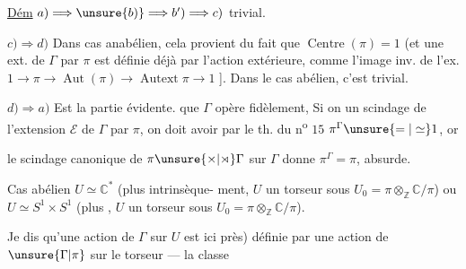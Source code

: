 


\uline{Dém} $a)\Longrightarrow\unsure{b)}\Longrightarrow b')\Longrightarrow c)$ trivial.

$c)\Longrightarrow d)$ Dans cas anabélien, cela provient
du fait que $\operatorname{Centre}(\pi)=1$ (et une ext.
de $\Gamma$ par $\pi$ est définie déjà par l'action
extérieure,  comme l'image inv.
de l'ex. $1\longrightarrow\pi\longrightarrow\operatorname{Aut}(\pi)
\longrightarrow\operatorname{Autext}\pi\longrightarrow1$ ].
Dans le cas abélien, c'est trivial.

$d)\Longrightarrow a)$ Est la partie  évidente. 
  que $\Gamma$
opère fidèlement, 
 
Si on  un scindage de l'extension
$\mathcal E$ de $\Gamma$ par $\pi$, on doit avoir
par le th. du n\textsuperscript{o} $15$ $\pi^\Gamma\unsure{=|\simeq}1$, or

le scindage canonique de $\pi\unsure{\times|\rtimes}\Gamma$ sur $\Gamma$
donne $\pi^\Gamma=\pi$, absurde.

Cas abélien $U\simeq\mathbb C^*$ (plus intrinsèque-
ment, $U$ un torseur sous $U_0=\pi\otimes_{\mathbb Z}\mathbb C/\pi$)
ou $U\simeq S^1\times S^1$ (plus ,
$U$ un torseur sous $U_0=\pi\otimes_{\mathbb Z}\mathbb C/\pi$).

Je dis qu'une action de $\Gamma$ sur $U$ est
ici    près) définie par une action
de $\unsure{\Gamma|\pi}$ sur le torseur --- la classe


